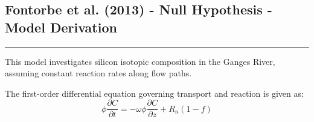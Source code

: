 \begin{tcolorbox}[
    colback=white,
    colframe=white,
    sharp corners,
    boxrule=0pt,
    breakable,
    width=\dimexpr\textwidth+1cm\relax,
    enlarge left by=-0.5cm,
    leftrule=0mm, rightrule=0mm, toprule=0mm, bottomrule=0mm
]


\subsection{Fontorbe et al. (2013) - Null Hypothesis - Model Derivation}
\vspace{-5mm}
{\footnotesize

\noindent\rule{\textwidth}{0.5pt}

This model investigates silicon isotopic composition in the Ganges River, assuming constant reaction rates along flow paths.

\begin{multicols}{2}

    The first-order differential equation governing transport and reaction is given as:
    \vspace{10mm}
    \columnbreak
    \begin{equation}
    \phi \frac{\partial C}{\partial t} = -\omega \phi \frac{\partial C}{\partial z} + R_n(1-f)
    \end{equation} 
    
\end{multicols}

    
}
\end{tcolorbox}

